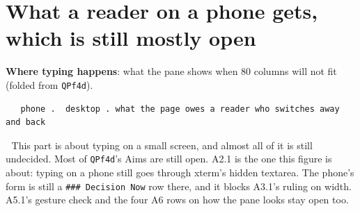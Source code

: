 \section{What a reader on a phone gets, which is still mostly open}
\textbf{Where typing happens}: what the pane shows when 80 columns will not fit (folded from \texttt{QPf4d}).

\begin{verbatim}
   phone .  desktop . what the page owes a reader who switches away and back
\end{verbatim}
📌 This part is about typing on a small screen, and almost all of it is still undecided. Most of \texttt{QPf4d}'s Aims are still open. A2.1 is the one this figure is about: typing on a phone still goes through xterm's hidden textarea. The phone's form is still a \texttt{\#\#\# Decision Now} row there, and it blocks A3.1's ruling on width. A5.1's gesture check and the four A6 rows on how the pane looks stay open too.

